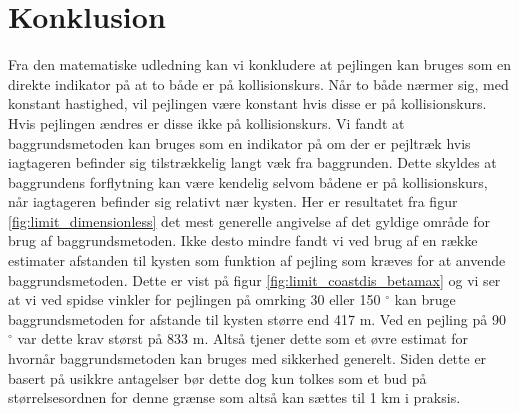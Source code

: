 \documentclass[%
 reprint,
nofootinbib,
aps,
]{revtex4-1}
\newtheorem*{theorem-non}{Teorem}
\begin{document}
\section{Konklusion}
Fra den matematiske udledning kan vi konkludere at pejlingen kan bruges som en direkte indikator på at to både er på kollisionskurs. Når to både nærmer sig, med konstant hastighed, vil pejlingen være konstant hvis disse er på kollisionskurs. Hvis pejlingen ændres er disse ikke på kollisionskurs. Vi fandt at baggrundsmetoden kan bruges som en indikator på om der er pejltræk hvis iagtageren befinder sig tilstrækkelig langt væk fra baggrunden. Dette skyldes at baggrundens forflytning kan være kendelig selvom bådene er på kollisionskurs, når iagtageren befinder sig relativt nær kysten. Her er resultatet fra figur \ref{fig:limit_dimensionless} det mest generelle angivelse af det gyldige område for brug af baggrundsmetoden. Ikke desto mindre fandt vi ved brug af en række estimater afstanden til kysten som funktion af pejling som kræves for at anvende baggrundsmetoden. Dette er vist på figur \ref{fig:limit_coastdis_betamax} og vi ser at vi ved spidse vinkler for pejlingen på omrking 30 eller 150 $^{\circ}$ kan bruge baggrundsmetoden for afstande til kysten større end 417 m. Ved en pejling på 90 $^{\circ}$ var dette krav størst på 833 m. Altså tjener dette som et øvre estimat for hvornår baggrundsmetoden kan bruges med sikkerhed generelt. Siden dette er basert på usikkre antagelser bør dette dog kun tolkes som et bud på størrelsesordnen for denne grænse som altså kan sættes til 1 km i praksis.







%
%


\end{document}
